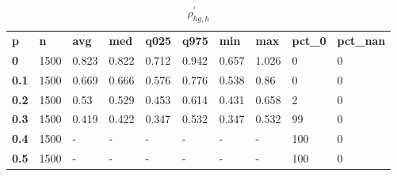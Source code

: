 \begin{table}[h]
 \centering 
\footnotesize
\caption{$\rho_{hg,h}^\prime $}
\label{tab:alphahgh}
\begin{tabular}[h]{| l l l l l l l l l l|
    } \hline
\textbf{ p} & \textbf{ n} & \textbf{ avg} & \textbf{ med} & \textbf{ q025} & \textbf{ q975} & \textbf{ min} & \textbf{ max} & \textbf{ pct\_0} & \textbf{ pct\_nan}
           \\
  \textbf{  0} & 1500 & 0.823 & 0.822 & 0.712 & 0.942 & 0.657 & 1.026 &   0 & 0
           \\
  \textbf{0.1} & 1500 & 0.669 & 0.666 & 0.576 & 0.776 & 0.538 &  0.86 &   0 & 0
           \\
  \textbf{0.2} & 1500 &  0.53 & 0.529 & 0.453 & 0.614 & 0.431 & 0.658 &   2 & 0
           \\
  \textbf{0.3} & 1500 & 0.419 & 0.422 & 0.347 & 0.532 & 0.347 & 0.532 &  99 & 0
           \\
  \textbf{0.4} & 1500 & - & - & - & - & - & - & 100 & 0
           \\
  \textbf{0.5} & 1500 & - & - & - & - & - & - & 100 & 0
           \\
 \hline \end{tabular}
 \end{table}
